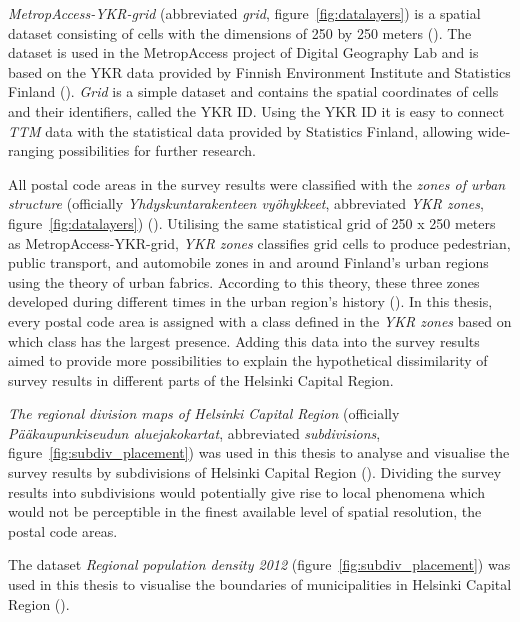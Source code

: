 \textit{MetropAccess-YKR-grid} (abbreviated \textit{grid}, figure~\ref{fig:datalayers}) is a spatial dataset consisting of cells with the dimensions of 250 by 250 meters (\cite{Toivonen2014a}). The dataset is used in the MetropAccess project of Digital Geography Lab and is based on the YKR data provided by Finnish Environment Institute and Statistics Finland (\cite{StatisticsFinland2020}). \textit{Grid} is a simple dataset and contains the spatial coordinates of cells and their identifiers, called the YKR ID. Using the YKR ID it is easy to connect \textit{TTM} data with the statistical data provided by Statistics Finland, allowing wide-ranging possibilities for further research.

All postal code areas in the survey results were classified with the \textit{zones of urban structure} (officially \textit{Yhdyskuntarakenteen vyöhykkeet}, abbreviated \textit{YKR zones}, figure~\ref{fig:datalayers}) (\cite{Ristimaki2017}). Utilising the same statistical grid of 250 x 250 meters as MetropAccess-YKR-grid, \textit{YKR zones} classifies grid cells to produce pedestrian, public transport, and automobile zones in and around Finland's urban regions using the theory of urban fabrics. According to this theory, these three zones developed during different times in the urban region's history (\cite{Newman2016}). In this thesis, every postal code area is assigned with a class defined in the \textit{YKR zones} based on which class has the largest presence. Adding this data into the survey results aimed to provide more possibilities to explain the hypothetical dissimilarity of survey results in different parts of the Helsinki Capital Region.

\textit{The regional division maps of Helsinki Capital Region} (officially \textit{Pääkaupunkiseudun aluejakokartat}, abbreviated \textit{subdivisions}, figure~\ref{fig:subdiv_placement}) was used in this thesis to analyse and visualise the survey results by subdivisions of Helsinki Capital Region (\cite{HelsinginEspoonVantaanjaKauniaistenmittausorganisaatiot2011}). Dividing the survey results into subdivisions would potentially give rise to local phenomena which would not be perceptible in the finest available level of spatial resolution, the postal code areas.

The dataset \textit{Regional population density 2012} (figure~\ref{fig:subdiv_placement}) was used in this thesis to visualise the boundaries of municipalities in Helsinki Capital Region (\cite{StatisticsFinland2012}). 

